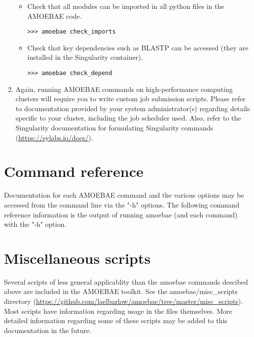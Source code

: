 \documentclass[12pt,letterpaper]{article}
\begin{document}
\begin{linenumbers}
\begin{enumerate}
\begin{itemize}
\item Check that all modules can be imported in all python files in the
    AMOEBAE code.
\begin{lstlisting}
>>> amoebae check_imports
\end{lstlisting}

\item Check that key dependencies such as BLASTP can be accessed (they are
    installed in the Singularity container).
\begin{lstlisting}
>>> amoebae check_depend
\end{lstlisting}

\end{itemize}

\item Again, running AMOEBAE commands on high-performance computing clusters
    will require you to write custom job submission scripts. Please refer to
        documentation provided by your system administrator(s) regarding
        details specific to your cluster, including the job scheduler used.
        Also, refer to the Singularity documentation for formulating
        Singularity commands (\url{https://sylabs.io/docs/}).


\end{enumerate}

\section{Command reference}

Documentation for each AMOEBAE command and the various options may be accessed
from the command line via the "-h" options. The following command reference
information is the output of running amoebae (and each command) with the "-h"
option.




\section{Miscellaneous scripts}

Several scripts of less general applicablity than the amoebae commands descibed
above are included in the AMOEBAE toolkit. See the amoebae/misc\_scripts
directory
(\url{https://github.com/laelbarlow/amoebae/tree/master/misc_scripts}). Most
scripts have information regarding usage in the files themselves. More detailed
information regarding some of these scripts may be added to this documentation
in the future.


\end{linenumbers}
\end{document}

